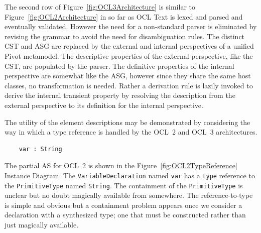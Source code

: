 \documentclass{jot}
\begin{document}
The second row of Figure~\ref{fig:OCL3Architecture} is similar to Figure~\ref{fig:OCL2Architecture} in so far as OCL Text is lexed and parsed and eventually validated. However the need for a non-standard parser is eliminated by revising the grammar to avoid the need for disambiguation rules. The distinct CST and ASG are replaced by the external and internal perspectives of a unified Pivot metamodel.
The descriptive properties of the external perspective, like the CST, are populated by the parser. The definitive properties of the internal perspective are somewhat like the ASG, however since they share the same host classes, no transformation is needed. Rather a derivation rule is lazily invoked to derive the internal transient property by resolving the description from the external perspective to its definition for the internal perspective.






The utility of the element descriptions may be demonstrated by considering the way in which a type reference is handled by the OCL~2 and OCL~3 architectures.

\begin{verbatim}
    var : String
\end{verbatim}

The partial AS for OCL~2 is shown in the Figure~\ref{fig:OCL2TypeReference} Instance Diagram. The \verb$VariableDeclaration$ named \verb$var$ has a \verb$type$ reference to the \verb$PrimitiveType$ named \verb$String$. The containment of the \verb$PrimitiveType$ is unclear but no doubt magically available from somewhere. The reference-to-type is simple and obvious but a containment problem appears once we consider a declaration with a synthesized type; one that must be constructed rather than just magically available.
\end{document}
